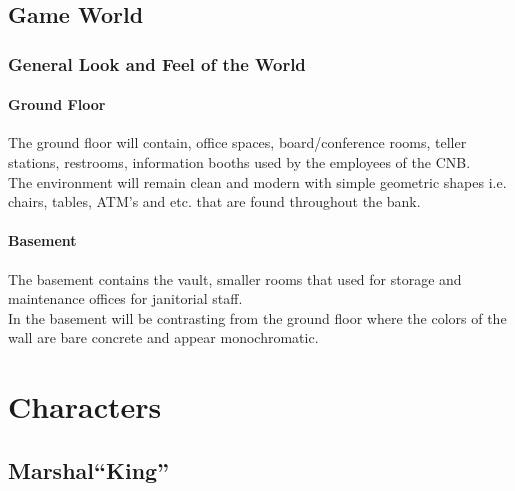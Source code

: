 \documentclass[10pt]{report}
\begin{document}
\section{Game World}

\subsection{General Look and Feel of the World}

\subsubsection{Ground Floor}

The ground floor will contain, office spaces, board/conference rooms, teller stations, restrooms, information booths used by the employees of the CNB.\\
The environment will remain clean and modern with simple geometric shapes i.e. chairs, tables, ATM’s and etc. that are found throughout the bank.

\subsubsection{Basement}

The basement contains the vault, smaller rooms that used for storage and maintenance offices for janitorial staff.\\
In the basement will be contrasting from the ground floor where the colors of the wall are bare concrete and appear monochromatic.

\chapter{Characters}

\section{Marshal``King''}
\end{document}

